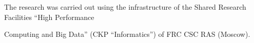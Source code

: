 









\vspace*{-12pt}





\Ack





\vspace*{-3pt}








\noindent


The research was carried out using the infrastructure of the Shared Research Facilities ``High Performance 


Computing and Big Data'' (CKP ``Informatics'') of FRC CSC RAS (Moscow).





\vspace*{3pt}





